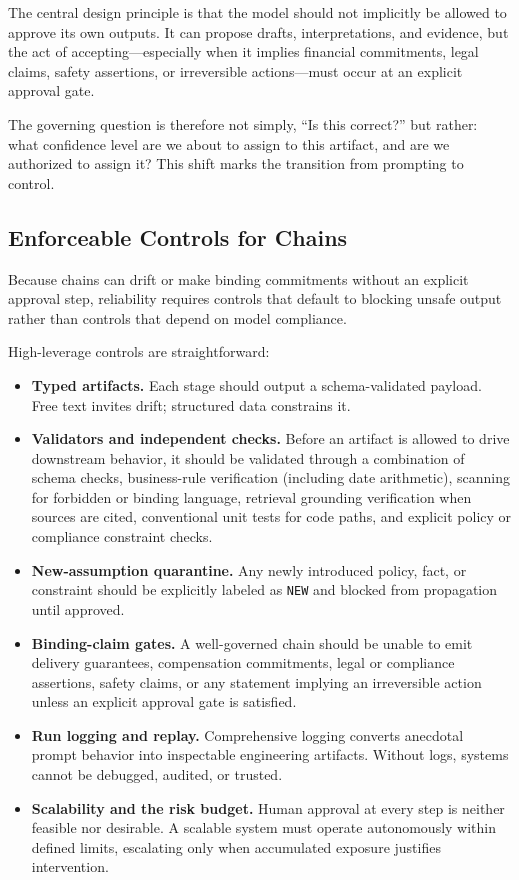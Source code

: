 The central design principle is that the model should not implicitly be allowed to approve its own outputs. It can propose drafts, interpretations, and evidence, but the act of accepting---especially when it implies financial commitments, legal claims, safety assertions, or irreversible actions---must occur at an explicit approval gate.

The governing question is therefore not simply, ``Is this correct?'' but rather: what confidence level are we about to assign to this artifact, and are we authorized to assign it? This shift marks the transition from prompting to control. 

\subsection{Enforceable Controls for Chains}
Because chains can drift or make binding commitments without an explicit approval step, reliability requires controls that default to blocking unsafe output rather than controls that depend on model compliance.

High-leverage controls are straightforward:
\begin{itemize}
  \item \textbf{Typed artifacts.}
  Each stage should output a schema-validated payload. Free text invites drift; structured data constrains it.

  \item \textbf{Validators and independent checks.}
  Before an artifact is allowed to drive downstream behavior, it should be validated through a combination of schema checks, business-rule verification (including date arithmetic), scanning for forbidden or binding language, retrieval grounding verification when sources are cited, conventional unit tests for code paths, and explicit policy or compliance constraint checks.

  \item \textbf{New-assumption quarantine.}
  Any newly introduced policy, fact, or constraint should be explicitly labeled as \texttt{NEW} and blocked from propagation until approved.

  \item \textbf{Binding-claim gates.}
  A well-governed chain should be unable to emit delivery guarantees, compensation commitments, legal or compliance assertions, safety claims, or any statement implying an irreversible action unless an explicit approval gate is satisfied.

  \item \textbf{Run logging and replay.}
  Comprehensive logging converts anecdotal prompt behavior into inspectable engineering artifacts. Without logs, systems cannot be debugged, audited, or trusted.

  \item \textbf{Scalability and the risk budget.}
  Human approval at every step is neither feasible nor desirable. A scalable system must operate autonomously within defined limits, escalating only when accumulated exposure justifies intervention.
\end{itemize}

